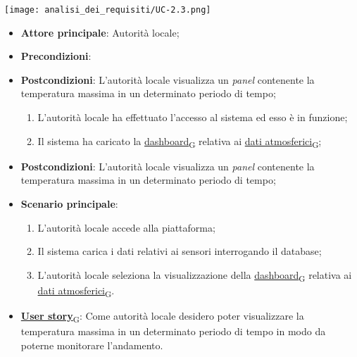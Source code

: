 \begin{center}
	\texttt{[image: analisi\_dei\_requisiti/UC-2.3.png]}
\end{center}
\begin{itemize}
	\item \textbf{Attore principale}: Autorità locale;
	\item \textbf{Precondizioni}: 	\item \textbf{Postcondizioni}: L'autorità locale visualizza un \textit{panel} contenente la temperatura massima in un determinato periodo di tempo;
	      \begin{enumerate}
		      \item L'autorità locale ha effettuato l'accesso al sistema ed esso è in funzione;
		      \item Il sistema ha caricato la \href{https://7last.github.io/docs/rtb/documentazione-interna/glossario\#dashboard}{dashboard\textsubscript{G}} relativa ai \href{https://7last.github.io/docs/rtb/documentazione-interna/glossario\#dati-atmosferici}{dati atmosferici\textsubscript{G}};
	      \end{enumerate}
	\item \textbf{Postcondizioni}: L'autorità locale visualizza un \textit{panel} contenente la temperatura massima in un determinato periodo di tempo;
	\item \textbf{Scenario principale}:
	      \begin{enumerate}
		      \item L'autorità locale accede alla piattaforma;
		      \item Il sistema carica i dati relativi ai sensori interrogando il database;
		      \item L'autorità locale seleziona la visualizzazione della \href{https://7last.github.io/docs/rtb/documentazione-interna/glossario\#dashboard}{dashboard\textsubscript{G}} relativa ai \href{https://7last.github.io/docs/rtb/documentazione-interna/glossario\#dati-atmosferici}{dati atmosferici\textsubscript{G}}.
	      \end{enumerate}

	\item \href{https://7last.github.io/docs/rtb/documentazione-interna/glossario\#user-story}{\textbf{User story}\textsubscript{G}}: Come autorità locale desidero poter visualizzare la temperatura massima in un determinato periodo di tempo
	      in modo da poterne monitorare l'andamento.
\end{itemize}

